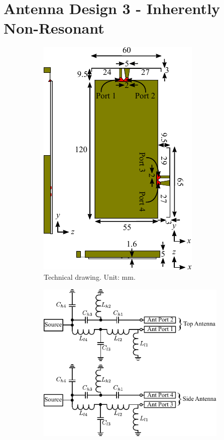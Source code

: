\section{Antenna Design 3 - Inherently Non-Resonant}
\label{sec:tech_sol_ant3}
\begin{figure}[htbp]
    \begin{subfigure}[b]{0.49\linewidth}
        \centering
        \includegraphics{img/tech_sol/nonresonant/technical}
        \caption{Technical drawing. Unit: mm.}
        \label{fig:ant3technical}
    \end{subfigure}
    \hfill
    \begin{subfigure}[b]{0.49\linewidth}
        \centering
        \includegraphics{img/tech_sol/nonresonant/schematic_tuning}\\[0cm]

\end{subfigure}
\end{figure}
